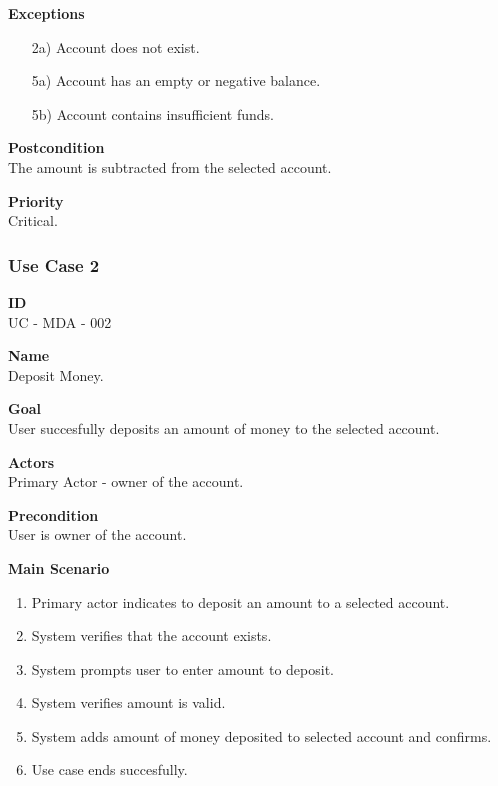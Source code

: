 \documentclass[12pt]{article}
\begin{document}
\noindent
    {\bf Exceptions}\\
    \vspace*{-0.2in}
\begin{itemize}
    \item[2a)] Account does not exist.
    \item[5a)] Account has an empty or negative balance.
    \item[5b)] Account contains insufficient funds.
\end{itemize}
    

\noindent
{\bf Postcondition}\\
The amount is subtracted from the selected account.

\noindent
{\bf Priority}\\
Critical.   


\subsubsection{Use Case 2} \label{uc:2}

\noindent
{\bf ID}\\
UC - MDA - 002

\noindent
{\bf Name}\\
Deposit Money.

\noindent
{\bf Goal}\\
User succesfully deposits an amount of money to the selected account.

\noindent
{\bf Actors}\\
Primary Actor - owner of the account.

\noindent
{\bf Precondition}\\
User is owner of the account.

\noindent
{\bf Main Scenario}\\
\vspace*{-0.2in}
\begin{enumerate}
  \item Primary actor indicates to deposit an amount to a selected account.
  \item System verifies that the account exists.
  \item System prompts user to enter amount to deposit.
  \item System verifies amount is valid.
  \item System adds amount of money deposited to selected account and confirms.
  \item Use case ends succesfully.
\end{enumerate}
\end{document}
